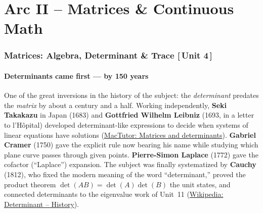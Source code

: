 \documentclass[11pt]{article}
\newcommand{\who}[1]{{\sffamily\bfseries #1}}
\newcommand{\yr}[1]{{\sffamily\color{BrickRed}(#1)}}
\newcommand{\unit}[1]{{\footnotesize\sffamily\color{RoyalBlue}[\,#1\,]}}
\begin{document}
\part*{Arc II -- Matrices \& Continuous Math}

\section{Matrices: Algebra, Determinant \& Trace \unit{Unit 4}}

\subsection{Determinants came first --- by 150 years}
One of the great inversions in the history of the subject: the \emph{determinant}
predates the \emph{matrix} by about a century and a half. Working independently,
\who{Seki Takakazu} in Japan \yr{1683} and \who{Gottfried Wilhelm Leibniz}
\yr{1693, in a letter to l'H\^opital} developed determinant-like expressions to
decide when systems of linear equations have solutions
(\href{https://mathshistory.st-andrews.ac.uk/HistTopics/Matrices_and_determinants/}{MacTutor:
Matrices and determinants}). \who{Gabriel Cramer} \yr{1750} gave the explicit rule
now bearing his name while studying which plane curve passes through given points.
\who{Pierre-Simon Laplace} \yr{1772} gave the cofactor (``Laplace'') expansion.
The subject was finally systematized by \who{Cauchy} \yr{1812}, who fixed the
modern meaning of the word ``determinant,'' proved the product theorem
$\det(AB)=\det(A)\det(B)$ the unit states, and connected determinants to the
eigenvalue work of Unit~11
(\href{https://en.wikipedia.org/wiki/Determinant\#History}{Wikipedia: Determinant
-- History}).
\end{document}

